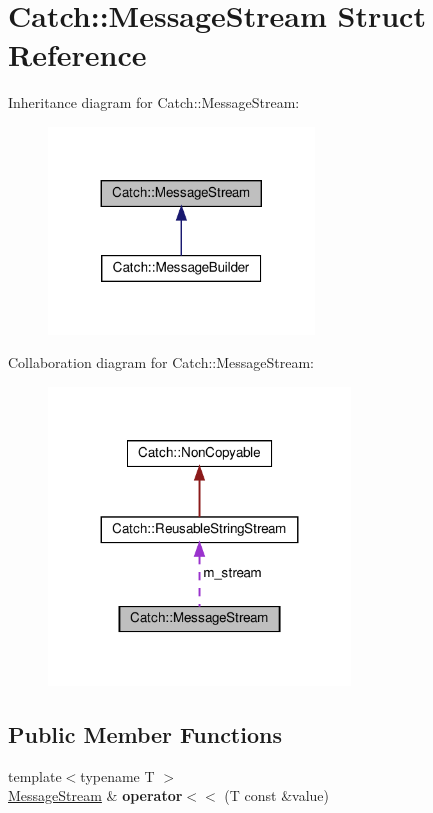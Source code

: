 \hypertarget{structCatch_1_1MessageStream}{}\section{Catch\+:\+:Message\+Stream Struct Reference}
\label{structCatch_1_1MessageStream}


Inheritance diagram for Catch\+:\+:Message\+Stream\+:
\nopagebreak
\begin{figure}[H]
\begin{center}
\leavevmode
\includegraphics[width=200pt]{structCatch_1_1MessageStream__inherit__graph}
\end{center}
\end{figure}


Collaboration diagram for Catch\+:\+:Message\+Stream\+:
\nopagebreak
\begin{figure}[H]
\begin{center}
\leavevmode
\includegraphics[width=227pt]{structCatch_1_1MessageStream__coll__graph}
\end{center}
\end{figure}
\subsection*{Public Member Functions}
\begin{DoxyCompactItemize}
\item 
\mbox{\label{structCatch_1_1MessageStream_a554c4aff5925a077e9fe9d858217428d}} 
{\footnotesize template$<$typename T $>$ }\\\hyperlink{structCatch_1_1MessageStream}{Message\+Stream} \& {\bfseries operator$<$$<$} (T const \&value)
\end{DoxyCompactItemize}
